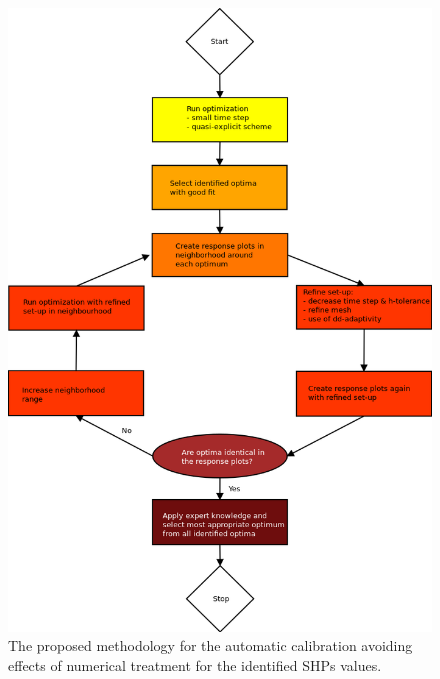 \documentclass[review]{elsarticle}
\begin{document}
\begin{figure}
\centering
\includegraphics[width=12cm]{flowchart/Flow_chart_barvy_new.png}
\caption{The proposed methodology for the automatic calibration avoiding effects of numerical treatment for the identified SHPs values.}
\label{flowchart}
\end{figure}
\end{document}
